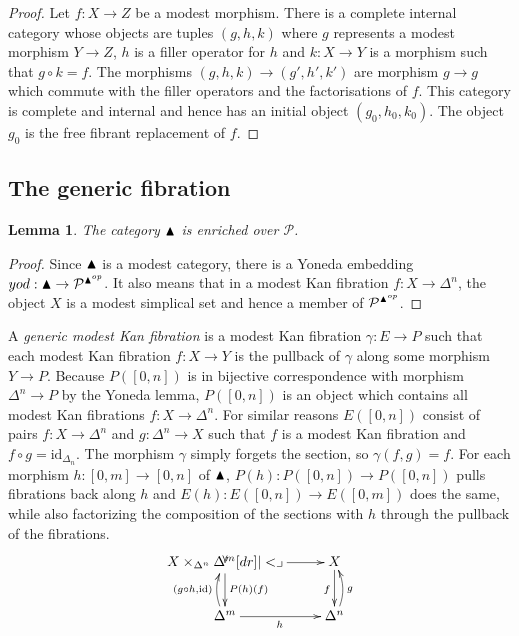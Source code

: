 \documentclass{amsart}
\theoremstyle{plain}
\newtheorem{lemma}[theorem]{Lemma}
\theoremstyle{definition}
\newcommand\cat\mathcal
\newcommand\id{\mathrm{id}}
\begin{document}
\begin{proof} Let $f:X \to Z$ be a modest morphism. There is a complete internal category whose objects are tuples $(g,h,k)$ where $g$ represents a modest morphism $Y\to Z$, $h$ is a filler operator for $h$ and $k:X\to Y$ is a morphism such that $g\circ k = f$. The morphisms $(g,h,k) \to (g', h', k')$ are morphism $g\to g$ which commute with the filler operators and the factorisations of $f$. This category is complete and internal and hence has an initial object $(g_0,h_0,k_0)$. The object $g_0$ is the free fibrant replacement of $f$.
\end{proof}





\subsection{The generic fibration}

\newcommand\yod{\mathord{yod}}
\begin{lemma} The category $\blacktriangle$ is enriched over $\cat P$. \end{lemma}

\begin{proof} Since $\blacktriangle$ is a modest category, there is a Yoneda embedding $\yod:\simpcat \to \cat P^{\simpcat\dual}$. It also means that in a modest Kan fibration $f:X\to \Delta^n$, the object $X$ is a modest simplical set and hence a member of $\cat P^{\simpcat\dual}$. 
\end{proof}

A \emph{generic modest Kan fibration} is a modest Kan fibration $\gamma:E\to P$ such that each modest Kan fibration $f:X\to Y$ is the pullback of $\gamma$ along some morphism $Y\to P$. Because $P([0,n])$ is in bijective correspondence with morphism $\Delta^n \to P$ by the Yoneda lemma, $P([0,n])$ is an object which contains all modest Kan fibrations $f:X\to \Delta^n$. For similar reasons $E([0,n])$ consist of pairs $f:X\to \Delta^n$ and $g:\Delta^n \to X$ such that $f$ is a modest Kan fibration and $f\circ g = \id_{\Delta_n}$. The morphism $\gamma$ simply forgets the section, so $\gamma(f,g) = f$. For each morphism $h:[0,m] \to [0,n]$ of $\blacktriangle$, $P(h):P([0,n])\to P([0,n])$ pulls fibrations back along $h$ and $E(h):E([0,n]) \to E([0,m])$ does the same, while also factorizing the composition of the sections with $h$ through the pullback of the fibrations.
\[\xymatrix{
X\times_{\Delta^n} \Delta^m \ar[r] \ar[d]^{P(h)(f)} \pb & X \ar[d]_f \\
\Delta^m \ar[r]_h\ar@/^/[u]^{(g\circ h,\id)} & \Delta^n \ar@/_/[u]_g
}\]
\end{document}
